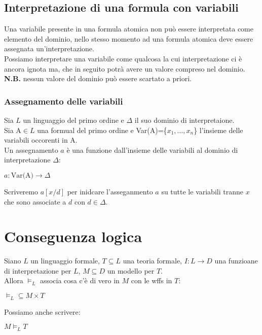 \documentclass[../main.tex]{subfiles}
\begin{document}
   \subsection{Interpretazione di una formula con variabili}
   Una variabile presente in una formula atomica non può essere interpretata come elemento del dominio, nello stesso momento ad una formula atomica deve essere assegnata un'interpretazione.\\
   Possiamo interpretare una variabile come qualcosa la cui interpretazione ci è ancora ignota ma, che in seguito potrà avere un valore compreso nel dominio.\\
   \textbf{N.B.} nessun valore del dominio può essere scartato a priori.

   \subsubsection{Assegnamento delle variabili}
   Sia $L$ un linguaggio del primo ordine e $\Delta$ il suo dominio di interpretaione.\\
   Sia A$\in L$ una formual del primo ordine e Var(A)=\{$x_1, \dots , x_n$\} l'insieme delle variabili occorenti in A.\\
   Un assegnamento $a$ è una funzione dall'insieme delle variabili al dominio di interpretazione $\Delta$:
   \begin{center}
      $a: \text{Var(A)} \to \Delta$
   \end{center}
   Scriveremo $a[x/d]$ per inidcare l'asseganmento $a$ su tutte le variabili tranne $x$ che sono associate a $d$ con $d \in \Delta$.

   \section{Conseguenza logica}
   Siano $L$ un linguaggio formale, $T \subseteq L$ una teoria formale, $I : L \to D$ una funzioane di interpretazione per $L$, $M \subseteq D$ un modello per $T$.\\
   Allora $\models_L$ associa cosa c'è di vero in $M$ con le wffs in $T$:
   \begin{center}
      $\models_L \subseteq M \times T$
   \end{center}
   Possiamo anche scrivere:
   \begin{center}
      $M \models_L T$
   \end{center}
\end{document}

